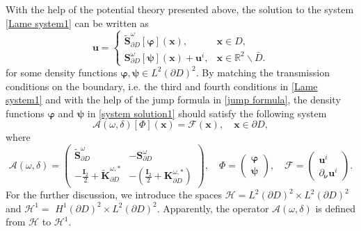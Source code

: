 \documentclass[10pt,reqno,oneside]{amsart}%
\theoremstyle{definition}
\theoremstyle{remark}
\numberwithin{equation}{section}
\numberwithin{equation}{section}
\begin{document}
With the help of the potential theory presented above, the solution to the system \eqref{Lame system1} can be written as
\begin{equation}\label{system solution1}
\mathbf{u}=
\begin{cases}
\tilde{\mathbf{S}}_{\partial D}^{\omega}[\boldsymbol{\varphi}](\mathbf{x}), & \mathbf{x} \in D , \\
\mathbf{S}_{\partial D}^{\omega}[\boldsymbol{\psi}](\mathbf{x})+\mathbf{u}^{i}, & \mathbf{x} \in \mathbb{R}^{2} \backslash \bar{D}.
\end{cases}
\end{equation}
for some density functions $\boldsymbol{\varphi}, \boldsymbol{\psi} \in L^{2}(\partial D)^{2}$. By matching the transmission conditions on the boundary, i.e. the third and fourth conditions in \eqref{Lame system1} and with the help of the jump formula in \eqref{jump formula}, the density functions $\boldsymbol{\varphi}$ and $\boldsymbol{\psi}$ in \eqref{system solution1} should satisfy the following system
\begin{equation}\label{Aomegadelta}
\mathcal{A}(\omega, \delta)[\Phi](\mathbf{x})=\mathcal{F}(\mathbf{x}), \quad \mathbf{x} \in \partial D,
\end{equation}
where
\begin{equation}\label{mathcalA}
\mathcal{A}(\omega, \delta)=
\left(\begin{array}{cc}
\tilde{\mathbf{S}}_{\partial D}^{\omega} & -\mathbf{S}_{\partial D}^{\omega} \\
-\frac{\mathbf{I}_2}{2}+\tilde{\mathbf{K}}_{\partial D}^{\omega, *} & -(\frac{\mathbf{I}_2}{2}+\mathbf{K}_{\partial D}^{\omega, *})
\end{array}\right), \quad
\Phi=\left(\begin{array}{c}
\boldsymbol{\varphi }\\
\boldsymbol{\psi}
\end{array}\right), \quad
\mathcal{F}=\left(\begin{array}{c}
\mathbf{u}^{i} \\
\partial_{\boldsymbol{\nu}} \mathbf{u}^{i}
\end{array}\right) .
\end{equation}
For the further discussion, we introduce the spaces {$\mathcal{H}=L^{2}(\partial D)^{2} \times L^{2}(\partial D)^{2}$ and $\mathcal{H}^{1}=$ $H^{1}(\partial D)^{2} \times L^{2}(\partial D)^{2}$}. Apparently, the operator $\mathcal{A}(\omega, \delta)$ is defined from $\mathcal{H}$ to $\mathcal{H}^{1}$.
\end{document}
